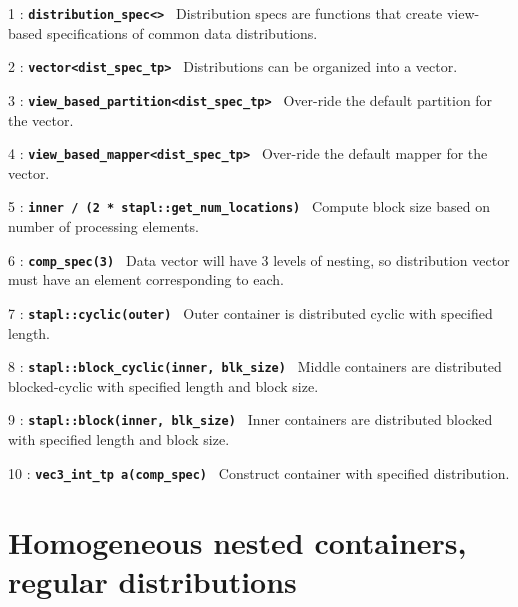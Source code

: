 \documentclass{report}
\begin{document}
\begin{hashitemize}
\item 1 : \texttt{{\bf distribution\_spec<> }}
\newline
Distribution specs are functions that create view-based specifications of common data distributions.
\item 2 : \texttt{{\bf vector<dist\_spec\_tp> }}
\newline
Distributions can be organized into a vector.
\item 3 : \texttt{{\bf view\_based\_partition<dist\_spec\_tp> }}
\newline
Over-ride the default partition for the vector.
\item 4 : \texttt{{\bf view\_based\_mapper<dist\_spec\_tp> }}
\newline
Over-ride the default mapper for the vector.
\item 5 : \texttt{{\bf inner / (2 * stapl::get\_num\_locations) }}
\newline
Compute block size based on number of processing elements.
\item 6 : \texttt{{\bf comp\_spec(3) }}
\newline
Data vector will have 3 levels of nesting, so distribution vector must have an element corresponding to each.
\item 7 : \texttt{{\bf stapl::cyclic(outer) }}
\newline
Outer container is distributed cyclic with specified length.
\item 8 : \texttt{{\bf stapl::block\_cyclic(inner, blk\_size) }}
\newline
Middle containers are distributed blocked-cyclic with specified length and block size.
\item 9 : \texttt{{\bf stapl::block(inner, blk\_size) }}
\newline
Inner containers are distributed blocked with specified length and block size.
\item 10 : \texttt{{\bf vec3\_int\_tp a(comp\_spec) }}
\newline
Construct container with specified distribution.
\end{hashitemize}


\pagebreak
\section{Homogeneous nested containers, regular distributions}
\end{document}
